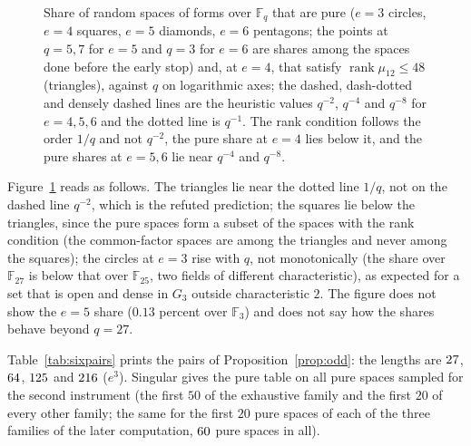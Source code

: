 \documentclass[11pt]{article}
\theoremstyle{definition}
\theoremstyle{remark}
\newcommand{\F}{\mathbb{F}}
\begin{document}
\begin{figure}[htbp]
\centering

\caption{Share of random spaces of forms over $\F_q$ that are pure ($e=3$ circles, $e=4$ squares, $e=5$ diamonds, $e=6$ pentagons; the points at $q=5,7$ for $e=5$ and $q=3$ for $e=6$ are shares among the spaces done before the early stop) and, at $e=4$, that satisfy $\operatorname{rank}\mu_{12}\le48$ (triangles), against $q$ on logarithmic axes; the dashed, dash-dotted and densely dashed lines are the heuristic values $q^{-2}$, $q^{-4}$ and $q^{-8}$ for $e=4,5,6$ and the dotted line is $q^{-1}$. The rank condition follows the order $1/q$ and not $q^{-2}$, the pure share at $e=4$ lies below it, and the pure shares at $e=5,6$ lie near $q^{-4}$ and $q^{-8}$.}
\label{fig:sixshare}
\end{figure}

Figure~\ref{fig:sixshare} reads as follows. The triangles lie near the dotted line $1/q$, not on the dashed line $q^{-2}$, which is the refuted prediction; the squares lie below the triangles, since the pure spaces form a subset of the spaces with the rank condition (the common-factor spaces are among the triangles and never among the squares); the circles at $e=3$ rise with $q$, not monotonically (the share over $\F_{27}$ is below that over $\F_{25}$, two fields of different characteristic), as expected for a set that is open and dense in $G_3$ outside characteristic $2$. The figure does not show the $e=5$ share ($0.13$ percent over $\F_3$) and does not say how the shares behave beyond $q=27$.

\begin{table}[htbp]
\centering\footnotesize

\caption{One pure pair of forms $f,g\in U_e$ for each prime field of Proposition~\ref{prop:odd}, printed in the monomials $x^iy^jz^k$ with coefficients of least absolute value; each is taken from the stored basis of the space, its Hilbert function is recomputed in the script and equals $h_e$, and its Betti table is $(1,2,2,1)$ on $(0,e,3e,4e)$ in both instruments.}
\label{tab:sixpairs}
\end{table}

Table~\ref{tab:sixpairs} prints the pairs of Proposition~\ref{prop:odd}: the lengths are $27$, $64$, $125$ and $216$ ($e^3$). Singular gives the pure table on all \nsixSingularSample{} pure spaces sampled for the second instrument (the first $50$ of the exhaustive family and the first $20$ of every other family; the same for the first $20$ pure spaces of each of the three families of the later computation, $60$ pure spaces in all).
\end{document}
